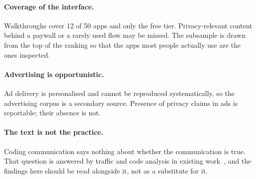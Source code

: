 \paragraph{Coverage of the interface.}
Walkthroughs cover 12 of 50 apps and only the free tier. Privacy-relevant
content behind a paywall or a rarely used flow may be missed. The subsample is
drawn from the top of the ranking so that the apps most people actually use are
the ones inspected.

\paragraph{Advertising is opportunistic.}
Ad delivery is personalised and cannot be reproduced systematically, so the
advertising corpus is a secondary source. Presence of privacy claims in ads is
reportable; their absence is not.

\paragraph{The text is not the practice.}
Coding communication says nothing about whether the communication is true.
That question is answered by traffic and code analysis in existing
work~\parencite{arkalakis2024abandon,hudig2025intimate,huckvale2019assessment},
and the findings here should be read alongside it, not as a substitute for it.
